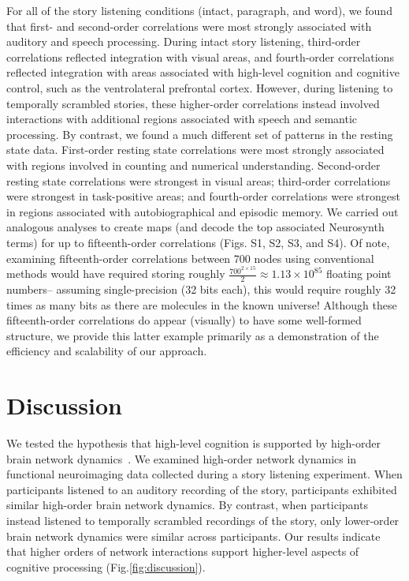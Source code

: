 \documentclass[english]{article}
\begin{document}
For all of the story listening conditions (intact, paragraph, and
word), we found that first- and second-order correlations were most
strongly associated with auditory and speech processing.  During
intact story listening, third-order correlations reflected integration
with visual areas, and fourth-order correlations reflected integration
with areas associated with high-level cognition and cognitive control,
such as the ventrolateral prefrontal cortex.  However, during
listening to temporally scrambled stories, these higher-order
correlations instead involved interactions with additional regions
associated with speech and semantic processing.  By contrast, we found
a much different set of patterns in the resting state data.
First-order resting state correlations were most strongly associated
with regions involved in counting and numerical understanding.
Second-order resting state correlations were strongest in visual
areas; third-order correlations were strongest in task-positive areas;
and fourth-order correlations were strongest in regions associated
with autobiographical and episodic memory.  We carried out analogous
analyses to create maps (and decode the top associated Neurosynth
terms) for up to fifteenth-order correlations (Figs. S1, S2, S3, and
S4).  Of note, examining fifteenth-order correlations between 700
nodes using conventional methods would have required storing roughly
$\frac{700^{2 \times 15}}{2} \approx 1.13 \times 10^{85}$ floating point
numbers-- assuming single-precision (32 bits each), this would require
roughly 32 times as many bits as there are molecules in the known
universe!  Although these fifteenth-order correlations do appear
(visually) to have some well-formed structure, we provide this latter
example primarily as a demonstration of the efficiency and scalability
of our approach.






\section*{Discussion}
We tested the hypothesis that high-level cognition is supported by
high-order brain network dynamics~\citep[e.g., see][]{SoloEtal19,
  ReimEtal17}.  We examined high-order network dynamics in functional
neuroimaging data collected during a story listening experiment.  When
participants listened to an auditory recording of the story,
participants exhibited similar high-order brain network dynamics.  By
contrast, when participants instead listened to temporally scrambled
recordings of the story, only lower-order brain network dynamics were
similar across participants.  Our results indicate that higher orders
of network interactions support higher-level aspects of cognitive
processing (Fig.\ref{fig:discussion}).
\end{document}
